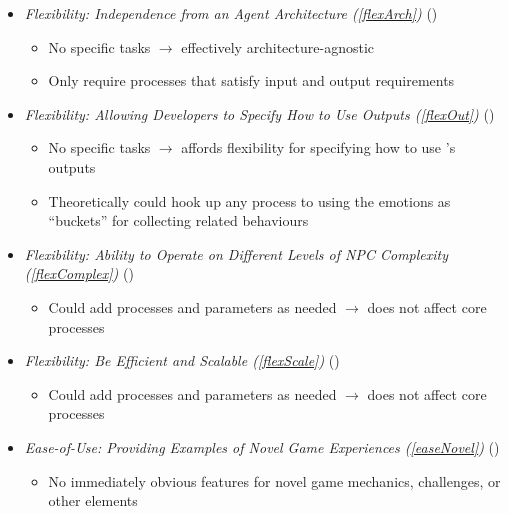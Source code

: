\begin{itemize}
    \item \textit{Flexibility: Independence from an Agent Architecture
        (\ref{flexArch})} (\good)
    \begin{itemize}
        \item No specific tasks $\rightarrow$ effectively architecture-agnostic

        \item Only require processes that satisfy input and output requirements
    \end{itemize}

    \item \textit{Flexibility: Allowing Developers to Specify How to Use
        Outputs (\ref{flexOut})} (\good)
    \begin{itemize}
        \item No specific tasks $\rightarrow$ affords flexibility for
        specifying how to use \progname{}'s outputs

        \item Theoretically could hook up any process to \progname{} using the
        emotions as ``buckets'' for collecting related behaviours
    \end{itemize}

    \item \textit{Flexibility: Ability to Operate on Different Levels of NPC
        Complexity (\ref{flexComplex})} (\good)
    \begin{itemize}
        \item Could add processes and parameters as needed $\rightarrow$ does
        not affect core \progname{} processes
    \end{itemize}

    \item \textit{Flexibility: Be Efficient and Scalable (\ref{flexScale})}
    (\good)
    \begin{itemize}
        \item Could add processes and parameters as needed $\rightarrow$ does
        not affect core \progname{} processes
    \end{itemize}

    \item \textit{Ease-of-Use: Providing Examples of Novel Game Experiences
        (\ref{easeNovel})} (\weak)
    \begin{itemize}
        \item No immediately obvious features for novel game mechanics,
        challenges, or other elements
    \end{itemize}
\end{itemize}

